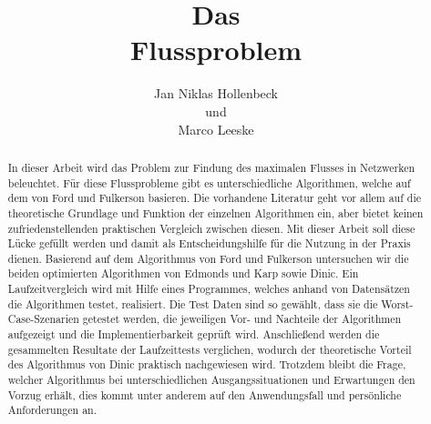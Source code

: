 \documentclass[a4paper]{llncs}
\begin{document}
\mainmatter  %

\title{Das \\ Flussproblem}


%
%
\author{Jan Niklas Hollenbeck \\ und \\ Marco Leeske}
\maketitle


\begin{abstract}

In dieser Arbeit wird das Problem zur Findung des maximalen
Flusses in Netzwerken beleuchtet.
Für diese Flussprobleme gibt es unterschiedliche Algorithmen, welche auf dem von Ford und Fulkerson basieren.
 Die vorhandene Literatur geht vor allem auf die theoretische Grundlage und Funktion der einzelnen Algorithmen ein,  aber bietet keinen zufriedenstellenden praktischen Vergleich zwischen diesen.
 Mit dieser Arbeit soll diese Lücke gefüllt werden und damit als Entscheidungshilfe für die Nutzung in der Praxis dienen.
Basierend auf dem Algorithmus von Ford und Fulkerson untersuchen wir die beiden optimierten Algorithmen von Edmonds und Karp sowie Dinic.
Ein Laufzeitvergleich wird mit Hilfe eines Programmes, welches anhand von Datensätzen die Algorithmen testet, realisiert.
Die Test Daten sind so gewählt, dass sie die Worst-Case-Szenarien getestet werden, die jeweiligen Vor- und Nachteile der Algorithmen aufgezeigt und die Implementierbarkeit geprüft wird.
Anschließend werden die gesammelten Resultate der Laufzeittests verglichen,
wodurch der theoretische Vorteil des Algorithmus von Dinic praktisch nachgewiesen wird.
 Trotzdem bleibt die Frage, welcher Algorithmus bei unterschiedlichen Ausgangssituationen und Erwartungen den Vorzug erhält, dies kommt unter anderem auf den Anwendungsfall und persönliche Anforderungen an.

\end{abstract}
\end{document}

